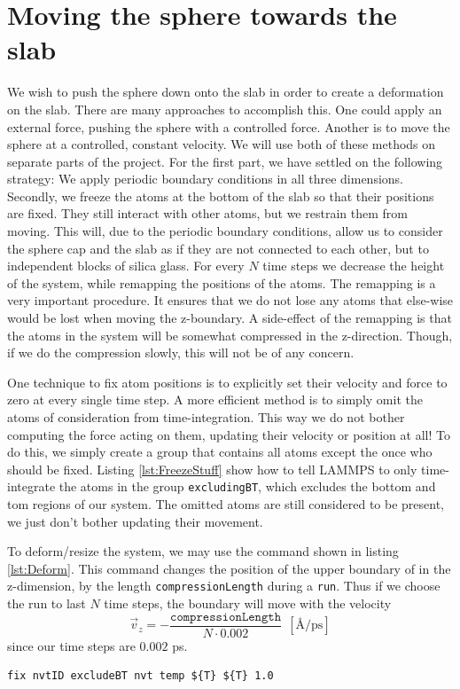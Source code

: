 \documentclass[twoside,english]{uiofysmaster}
\begin{document}
\section{Moving the sphere towards the slab}
We wish to push the sphere down onto the slab in order to create a deformation on the slab. There are many approaches to accomplish this. 
One could apply an external force, pushing the sphere with a controlled force. 
Another is to move the sphere at a controlled, constant velocity.  
We will use both of these methods on separate parts of the project.
For the first part, we have settled on the following strategy:
We apply periodic boundary conditions in all three dimensions. 
Secondly, we freeze the atoms at the bottom of the slab so that their positions are fixed. 
They still interact with other atoms, but we restrain them from moving. 
This will, due to the periodic boundary conditions, allow us to consider the sphere cap and the slab as if they are not connected to each other, but to independent blocks of silica glass.  
For every $N$ time steps we decrease the height of the system, while remapping the positions of the atoms. 
The remapping is a very important procedure. 
It ensures that we do not lose any atoms that else-wise would be lost when moving the z-boundary. 
A side-effect of the remapping is that the atoms in the system will be somewhat compressed in the z-direction. 
Though, if we do the compression slowly, this will not be of any concern. 

One technique to fix atom positions is to explicitly set their velocity and force to zero at every single time step.
A more efficient method is to simply omit the atoms of consideration from time-integration. 
This way we do not bother computing the force acting on them, updating their velocity or position at all! 
To do this, we simply create a group that contains all atoms except the once who should be fixed.
Listing \ref{lst:FreezeStuff} show how to tell LAMMPS to only time-integrate the atoms in the group \texttt{excludingBT}, which excludes the bottom and tom regions of our system.
The omitted atoms are still considered to be present, we just don't bother updating their movement.

To deform/resize the system, we may use the command shown in listing \ref{lst:Deform}. 
This command changes the position of the upper boundary of in the z-dimension, by the length \texttt{compressionLength} during a \texttt{run}.
Thus if we choose the run to last $N$ time steps, the boundary will move with the velocity 
\begin{equation}
	\vec{v}_z = -\frac{\texttt{compressionLength}}{N\cdot0.002} ~~ [\text{\AA/ps}]
\end{equation}
since our time steps are $0.002$ ps.
\begin{lstlisting}[caption={Time-integrating only atoms in a specified group, \texttt{excludeBT}, effectively fixing all others.}, label={lst:FreezeStuff}, language=LammpsInput]
fix nvtID excludeBT nvt temp ${T} ${T} 1.0
\end{lstlisting}
\end{document}
